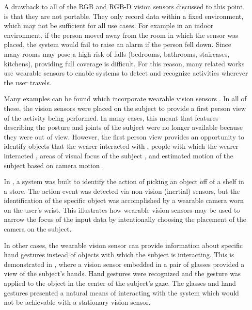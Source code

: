 \documentclass[12pt]{report}
\begin{document}
A drawback to all of the RGB and RGB-D vision sensors discussed to this point is that they are not portable. They only record data within a fixed environment, which may not be sufficient for all use cases. For example in an indoor environment, if the person moved away from the room in which the sensor was placed, the system would fail to raise an alarm if the person fell down. Since many rooms may pose a high risk of falls (bedrooms, bathrooms, staircases, kitchens), providing full coverage is difficult. For this reason, many related works use wearable sensors to enable systems to detect and recognize activities wherever the user travels.

Many examples can be found which incorporate wearable vision sensors \cite{Radhakrishnan2016, Mahabalagiri2013, Li2016, Baraldi2015, McCandless2013, Wang2018, Damen2018ScalingDataset, Sudhakaran2018, Gokce2019HumanPairs}. In all of these, the vision sensors were placed on the subject to provide a first person view of the activity being performed. In many cases, this meant that features describing the posture and joints of the subject were no longer available because they were out of view. However, the first person view provides an opportunity to identify objects that the wearer interacted with \cite{Pirsiavash2012, Radhakrishnan2016, McCandless2013, Damen2018ScalingDataset}, people with which the wearer interacted \cite{Li2016}, areas of visual focus of the subject \cite{Sudhakaran2018, Matsuo2014}, and estimated motion of the subject based on camera motion \cite{Mahabalagiri2013}. 

In \cite{Radhakrishnan2016}, a system was built to identify the action of picking an object off of a shelf in a store. The action event was detected via non-vision (inertial) sensors, but the identification of the specific object was accomplished by a wearable camera worn on the user's wrist. This illustrates how wearable vision sensors may be used to narrow the focus of the input data by intentionally choosing the placement of the camera on the subject.

In other cases, the wearable vision sensor can provide information about specific hand gestures instead of objects with which the subject is interacting. This is demonstrated in \cite{Baraldi2015}, where a vision sensor embedded in a pair of glasses provided a view of the subject’s hands. Hand gestures were recognized and the gesture was applied to the object in the center of the subject’s gaze. The glasses and hand gestures presented a natural means of interacting with the system which would not be achievable with a stationary vision sensor.
\end{document}

